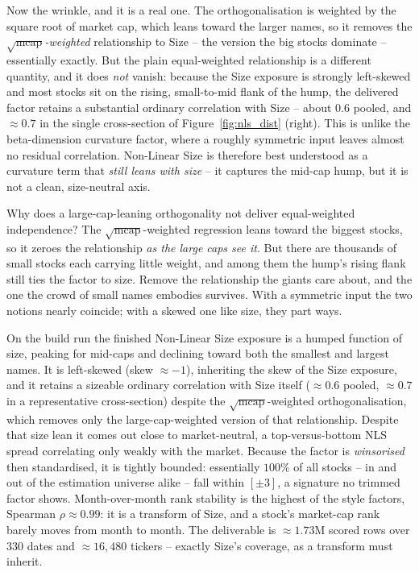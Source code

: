 \documentclass[11pt]{article}
\theoremstyle{definition}
\theoremstyle{plain}
\theoremstyle{remark}
\begin{document}
Now the wrinkle, and it is a real one. The orthogonalisation is weighted by the square root of market cap, which leans toward the larger names, so it removes the \emph{$\sqrt{\text{mcap}}$-weighted} relationship to Size -- the version the big stocks dominate -- essentially exactly. But the plain equal-weighted relationship is a different quantity, and it does \emph{not} vanish: because the Size exposure is strongly left-skewed and most stocks sit on the rising, small-to-mid flank of the hump, the delivered factor retains a substantial ordinary correlation with Size -- about $0.6$ pooled, and $\approx 0.7$ in the single cross-section of Figure~\ref{fig:nls_dist} (right). This is unlike the beta-dimension curvature factor, where a roughly symmetric input leaves almost no residual correlation. Non-Linear Size is therefore best understood as a curvature term that \emph{still leans with size} -- it captures the mid-cap hump, but it is not a clean, size-neutral axis.

\begin{intuition}
Why does a large-cap-leaning orthogonality not deliver equal-weighted independence? The $\sqrt{\text{mcap}}$-weighted regression leans toward the biggest stocks, so it zeroes the relationship \emph{as the large caps see it}. But there are thousands of small stocks each carrying little weight, and among them the hump's rising flank still ties the factor to size. Remove the relationship the giants care about, and the one the crowd of small names embodies survives. With a symmetric input the two notions nearly coincide; with a skewed one like size, they part ways.
\end{intuition}

\begin{observed}
On the build run the finished Non-Linear Size exposure is a humped function of size, peaking for mid-caps and declining toward both the smallest and largest names. It is left-skewed (skew $\approx -1$), inheriting the skew of the Size exposure, and it retains a sizeable ordinary correlation with Size itself ($\approx 0.6$ pooled, $\approx 0.7$ in a representative cross-section) despite the $\sqrt{\text{mcap}}$-weighted orthogonalisation, which removes only the large-cap-weighted version of that relationship. Despite that size lean it comes out close to market-neutral, a top-versus-bottom NLS spread correlating only weakly with the market. Because the factor is \emph{winsorised} then standardised, it is tightly bounded: essentially $100\%$ of all stocks -- in and out of the estimation universe alike -- fall within $[\pm 3]$, a signature no trimmed factor shows. Month-over-month rank stability is the highest of the style factors, Spearman $\rho \approx 0.99$: it is a transform of Size, and a stock's market-cap rank barely moves from month to month. The deliverable is $\approx 1.73$M scored rows over $330$ dates and $\approx 16{,}480$ tickers -- exactly Size's coverage, as a transform must inherit.
\end{observed}
\end{document}
